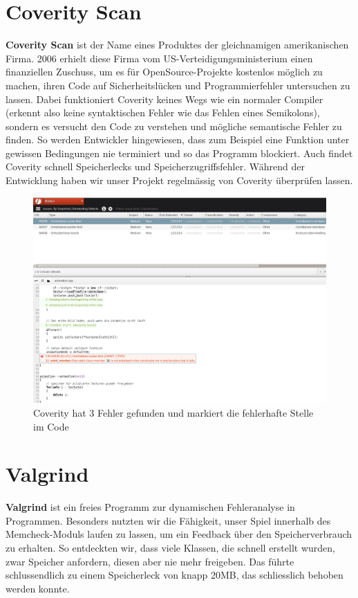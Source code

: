 \documentclass[11pt,a4paper]{scrbook}
\begin{document}
\section{Coverity Scan}
\textbf{Coverity Scan} ist der Name eines Produktes der gleichnamigen amerikanischen Firma. 2006 erhielt diese Firma vom US-Verteidigungsministerium
einen finanziellen Zuschuss, um es für OpenSource-Projekte kostenlos möglich zu machen, ihren Code auf Sicherheitslücken und Programmierfehler untersuchen
zu lassen. Dabei funktioniert Coverity keines Wegs wie ein normaler Compiler (erkennt also keine syntaktischen Fehler wie das Fehlen eines Semikolons),
sondern es versucht den Code zu verstehen und mögliche semantische Fehler zu finden. So werden Entwickler hingewiesen, dass zum Beispiel eine Funktion
unter gewissen Bedingungen nie terminiert und so das Programm blockiert. Auch findet Coverity schnell Speicherlecks und Speicherzugriffsfehler.
Während der Entwicklung haben wir unser Projekt regelmässig von Coverity überprüfen lassen.
\begin{figure}
\centering
\includegraphics[scale=0.4]{img/coverity.png}
\caption{Coverity hat 3 Fehler gefunden und markiert die fehlerhafte Stelle im Code}
\end{figure}

\section{Valgrind}
\textbf{Valgrind} ist ein freies Programm zur dynamischen Fehleranalyse in Programmen. Besonders nutzten wir die Fähigkeit,
unser Spiel innerhalb des Memcheck-Moduls laufen zu lassen, um ein Feedback über den Speicherverbrauch zu erhalten. So entdeckten
wir, dass viele Klassen, die schnell erstellt wurden, zwar Speicher anfordern, diesen aber nie mehr freigeben. Das führte schlussendlich
zu einem Speicherleck von knapp 20MB,
 das schliesslich behoben werden konnte.
\end{document}
